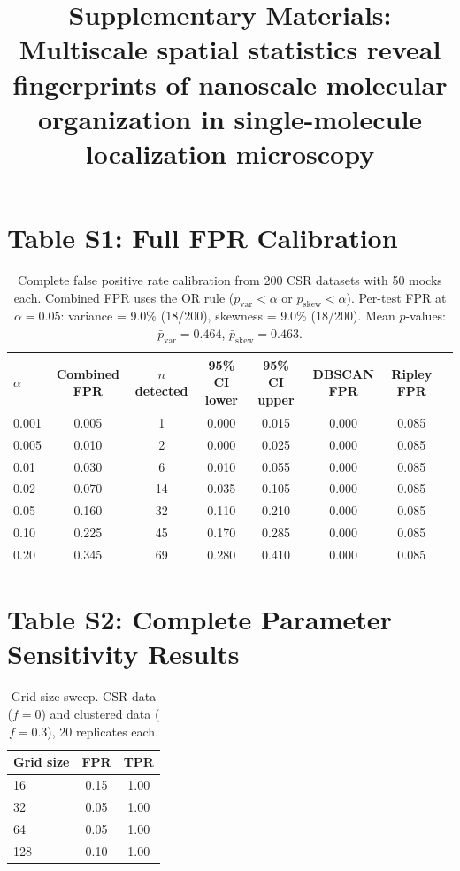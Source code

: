 \documentclass[11pt]{article}
\title{Supplementary Materials:\\
  Multiscale spatial statistics reveal fingerprints of nanoscale molecular
  organization in single-molecule localization microscopy}
\author{}
\date{}
\begin{document}
\maketitle

\section*{Table S1: Full FPR Calibration}

\begin{table}[ht]
\centering
\caption{Complete false positive rate calibration from 200 CSR datasets
  with 50 mocks each. Combined FPR uses the OR rule
  ($p_\mathrm{var} < \alpha$ or $p_\mathrm{skew} < \alpha$). Per-test
  FPR at $\alpha = 0.05$: variance = 9.0\% (18/200), skewness = 9.0\%
  (18/200). Mean $p$-values: $\bar{p}_\mathrm{var} = 0.464$,
  $\bar{p}_\mathrm{skew} = 0.463$.}
\label{tab:s1_fpr}
\begin{tabular}{lccccccc}
\toprule
$\alpha$ & Combined FPR & $n$ detected & 95\% CI lower & 95\% CI upper
  & DBSCAN FPR & Ripley FPR \\
\midrule
0.001 & 0.005 & 1   & 0.000 & 0.015 & 0.000 & 0.085 \\
0.005 & 0.010 & 2   & 0.000 & 0.025 & 0.000 & 0.085 \\
0.01  & 0.030 & 6   & 0.010 & 0.055 & 0.000 & 0.085 \\
0.02  & 0.070 & 14  & 0.035 & 0.105 & 0.000 & 0.085 \\
0.05  & 0.160 & 32  & 0.110 & 0.210 & 0.000 & 0.085 \\
0.10  & 0.225 & 45  & 0.170 & 0.285 & 0.000 & 0.085 \\
0.20  & 0.345 & 69  & 0.280 & 0.410 & 0.000 & 0.085 \\
\bottomrule
\end{tabular}
\end{table}

\section*{Table S2: Complete Parameter Sensitivity Results}

\begin{table}[ht]
\centering
\caption{Grid size sweep. CSR data ($f = 0$) and clustered data
  ($f = 0.3$), 20 replicates each.}
\label{tab:s2_grid}
\begin{tabular}{lcc}
\toprule
Grid size & FPR & TPR \\
\midrule
16  & 0.15 & 1.00 \\
32  & 0.05 & 1.00 \\
64  & 0.05 & 1.00 \\
128 & 0.10 & 1.00 \\
\bottomrule
\end{tabular}
\end{table}
\end{document}
